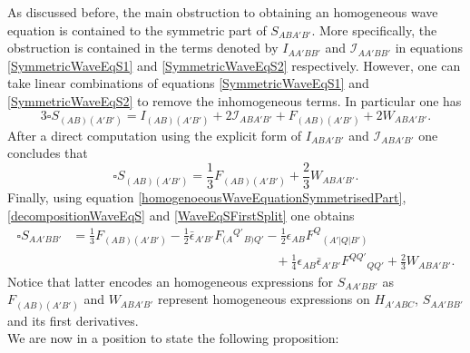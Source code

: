 \documentclass[10pt,a4paper]{article}
\theoremstyle{plain}
\begin{document}
As discussed before, the main obstruction to obtaining an homogeneous wave
equation is contained to the symmetric part of $S_{ABA'B'}$. More
specifically, the obstruction is contained in the terms denoted by $I_{AA'BB'}$ and
$\mathcal{I}_{AA'BB'}$ in equations \eqref{SymmetricWaveEqS1} and
\eqref{SymmetricWaveEqS2} respectively. However,
 one can take linear combinations of
equations \eqref{SymmetricWaveEqS1} and \eqref{SymmetricWaveEqS2} to
remove the inhomogeneous terms.  In particular one has
\begin{equation*}
3\square S_{(AB)(A'B')}= I_{(AB)(A'B')} + 2\mathcal{I}_{ABA'B'}+
F_{(AB)(A'B')} + 2W_{ABA'B'}.
\end{equation*}
After a direct computation using the explicit form of $I_{ABA'B'}$ and
$\mathcal{I}_{ABA'B'}$ one concludes that
\begin{equation} \label{homogenoeousWaveEquationSymmetrisedPart}
\square S_{(AB)(A'B')}=\frac{1}{3} F_{(AB)(A'B')} +
\frac{2}{3}W_{ABA'B'}.
\end{equation}
 Finally, using equation
 \eqref{homogenoeousWaveEquationSymmetrisedPart},
 \eqref{decompositionWaveEqS} and \eqref{WaveEqSFirstSplit} one
 obtains
\begin{align}
\label{FinalWaveEqS}
\square S_{AA'BB'} & = \frac{1}{3} F_{(AB)(A'B')} - \tfrac{1}{2}
\bar{\epsilon}_{A'B'} F_{(A}{}^{Q'}{}_{B)Q'} - \tfrac{1}{2}
\epsilon_{AB} F^{Q}{}_{(A'|Q|B')}\nonumber \\ & \qquad \qquad \qquad
\qquad \qquad \qquad \qquad \qquad + \tfrac{1}{4} \epsilon_{AB}
\bar{\epsilon}_{A'B'}F^{QQ'}{}_{QQ'} + \frac{2}{3}W_{ABA'B'}.
\end{align}
Notice that latter encodes an homogeneous expressions for $S_{AA'BB'}$
as $F_{(AB)(A'B')}$ and $W_{ABA'B'}$ represent homogeneous expressions
on $H_{A'ABC}$, $S_{AA'BB'}$ and its first derivatives.
\\

We are now in a position to state the following proposition:
\end{document}
